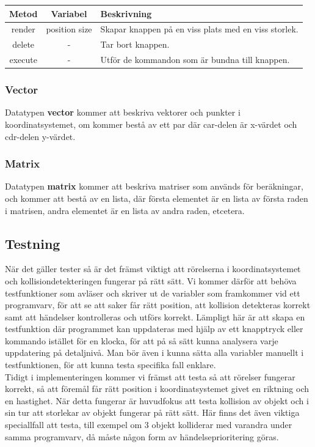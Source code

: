 \documentclass[12pt,a4paper]{article}
\begin{document}
\begin{tabular}{| c | c | p{8.9cm} |}
	\hline
	\textbf{Metod} & \textbf{Variabel} & \textbf{Beskrivning} \\
	\hline
	
	render & position size & Skapar knappen på en viss plats med en viss storlek.\\
	\hline
	delete & - & Tar bort knappen. \\
	\hline
	execute & - & Utför de kommandon som är bundna till knappen. \\
	\hline
\end{tabular}

\subsubsection{Vector}
Datatypen \textbf{vector} kommer att beskriva vektorer och punkter i koordinatsystemet, om kommer bestå av ett par där car-delen är x-värdet och cdr-delen y-värdet.

\subsubsection{Matrix}
Datatypen \textbf{matrix} kommer att beskriva matriser som används för beräkningar, och kommer att bestå av en lista, där första elementet är en lista av första raden i matrisen, andra elementet är en lista av andra raden, etcetera.


\subsection{Testning}
När det gäller tester så är det främst viktigt att rörelserna i koordinatsystemet och kollisiondetekteringen fungerar på rätt sätt. Vi kommer därför att behöva testfunktioner som avläser och skriver ut de variabler som framkommer vid ett programvarv, för att se att saker får rätt position, att kollision detekteras korrekt samt att händelser kontrolleras och utförs korrekt. Lämpligt här är att skapa en testfunktion där programmet kan uppdateras med hjälp av ett knapptryck eller kommando istället för en klocka, för att på så sätt kunna analysera varje uppdatering på detaljnivå. Man bör även i kunna sätta alla variabler manuellt i testfunktionen, för att kunna testa specifika fall enklare. \\

Tidigt i implementeringen kommer vi främst att testa så att rörelser fungerar korrekt, så att föremål får rätt position i koordinatsystemet givet en riktning och en hastighet. När detta fungerar är huvudfokus att testa kollision av objekt och i sin tur att storlekar av objekt fungerar på rätt sätt. Här finns det även viktiga speciallfall att testa, till exempel om 3 objekt kolliderar med varandra under samma programvarv, då måste någon form av händelseprioritering göras. \\
\end{document}

